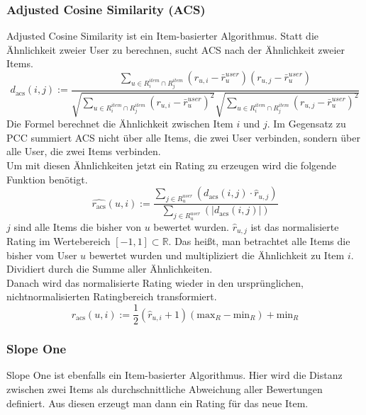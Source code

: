 \subsubsection{Adjusted Cosine Similarity (ACS)}\label{s.adjcos}
Adjusted Cosine Similarity ist ein Item-basierter Algorithmus. Statt die Ähnlichkeit zweier User zu berechnen, sucht ACS nach der Ähnlichkeit zweier Items.
\begin{equation}
 d_{\mathrm{acs}}(i,j) := \dfrac{\sum\limits_{u\in R^{item}_{i} \cap R^{item}_{j}} (r_{u,i}-\bar{r}^{user}_{u})(r_{u,j}-\bar{r}^{user}_{u})}  {\sqrt{\sum\limits_{u\in R^{item}_{i} \cap R^{item}_{j}}(r_{u,i}-\bar{r}^{user}_{u})^2}\sqrt{\sum\limits_{u\in R^{item}_{i} \cap R^{item}_{j}}(r_{u,j}-\bar{r}^{user}_{u})^2}} 	\label{adjcosformula1}
\end{equation}
Die Formel berechnet die Ähnlichkeit zwischen Item $i$ und $j$. Im Gegensatz zu PCC summiert ACS nicht über alle Items, die zwei User verbinden, sondern über alle User, die zwei Items verbinden.\\
Um mit diesen Ähnlichkeiten jetzt ein Rating zu erzeugen wird die folgende Funktion benötigt.
\begin{equation}
 \hat{r_\mathrm{acs}}(u,i) := \dfrac{\sum\limits_{j\in R^{user}_{u}} (d_{\mathrm{acs}}(i,j)\cdot \hat{r}_{u,j})}  {\sum\limits_{j\in R^{user}_{u}} (|d_{\mathrm{acs}}(i,j)|)} 	\label{adjcosformula2}
\end{equation}	
$j$ sind alle Items die bisher von $u$ bewertet wurden. $\hat{r}_{u,j}$ ist das normalisierte Rating im Wertebereich $[-1,1]\subset \mathbb{R}$. Das heißt, man betrachtet alle Items die bisher vom User $u$ bewertet wurden und multipliziert die Ähnlichkeit zu Item $i$. Dividiert durch die Summe aller Ähnlichkeiten.\\
Danach wird das normalisierte Rating wieder in den ursprünglichen, nichtnormalisierten Ratingbereich transformiert.
\begin{equation}
r_{\mathrm{acs}}(u,i) := \dfrac{1}{2}(\hat{r}_{u,i}+1)(\mathrm{max}_{R}-\mathrm{min}_{R})+\mathrm{min}_{R} 	\label{adjcosformula3}
\end{equation}	

\subsubsection{Slope One}\label{s.slopeone}
Slope One ist ebenfalls ein Item-basierter Algorithmus. Hier wird die Distanz zwischen zwei Items als durchschnittliche Abweichung aller Bewertungen definiert. Aus diesen erzeugt man dann ein Rating für das neue Item.
 
